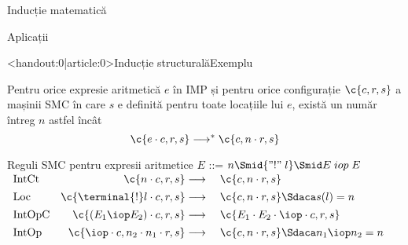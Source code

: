 \begin{section}{Inducție matematică}
\begin{subsection}{Aplicații}
\begin{frame}<handout:0|article:0>{Inducție structurală}{Exemplu}
\begin{theorem}
Pentru orice expresie aritmetică $e$ în IMP și pentru  orice configurație $\c{c,r,s}$ a mașinii SMC în care $s$ e definită pentru toate locațiile lui $e$, există un număr întreg $n$ astfel încât 
$$\c{e\cdot c,  r, s} \longrightarrow^\ast \c{c, n\cdot r, s}$$
\end{theorem}
\begin{block}{Reguli SMC pentru expresii  aritmetice $E$ ::= $n \Smid {\mathrel{"!"} l} \Smid E \mathrel{iop} E$}
$\begin{array}{l@{\extracolsep{1em}}r@{{}\longrightarrow{}}l}
\mbox{IntCt}&
\c{n\cdot c,r,s} & \c{c, n \cdot r, s}
\\[1ex]
\mbox{Loc}&
\c{\terminal{!} l\cdot c,r,s} & \c{c, n \cdot r, s}  \Sdaca s(l) = n
\\[1ex]
\mbox{IntOpC}&
\c{(E_1 \iop E_2) \cdot c, r, s} & \c{E_1 \cdot E_2 \cdot \iop \cdot c, r, s}
\\[1ex]
\mbox{IntOp}&
\c{\iop \cdot c, n_2\cdot n_1 \cdot r, s} & \c{c, n \cdot r, s} \Sdaca n_1 \iop n_2 = n
\end{array}$
\end{block}
\end{frame}



\begin{frame}{}{}


\end{frame}
\end{subsection}
\end{section}
